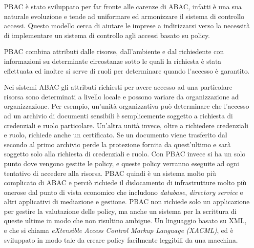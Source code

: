 PBAC è stato sviluppato per far fronte alle carenze di ABAC, infatti è una sua naturale evoluzione e tende ad uniformare ed armonizzare il sistema di controllo accessi.
Questo modello cerca di aiutare le imprese a indirizzarsi verso la necessità di implementare un sistema di controllo agli accessi basato su policy.\\ \par
PBAC combina attributi dalle risorse, dall'ambiente e dal richiedente con informazioni su determinate circostanze sotto le quali la richiesta è stata effettuata ed inoltre si serve di 
ruoli per determinare quando l'accesso è garantito.\\ \par
Nei sistemi ABAC gli attributi richiesti per avere accesso ad una particolare risorsa sono determinati a livello locale e possono variare da organizzazione ad organizzazione.
Per esempio, un'unità organizzativa può determinare che l'accesso ad un archivio di documenti sensibili è semplicemente soggetto a richiesta di credenziali e ruolo particolare.
Un'altra unità invece, oltre a richiedere credenziali e ruolo, richiede anche un certificato. Se un documento viene trasferito dal secondo al primo archivio perde la protezione fornita da quest'ultimo e sarà soggetto solo alla richiesta di credenziali e ruolo.
Con PBAC invece si ha un solo punto dove vengono gestite le policy, e queste policy verranno eseguite ad ogni tentativo di accedere alla risorsa.
PBAC quindi è un sistema molto più complicato di ABAC e perciò richiede il dislocamento di infrastrutture molto più onerose dal punto di vista economico che includono \textit{database}, \textit{directory service} e altri applicativi di mediazione e gestione.
PBAC non richiede solo un applicazione per gestire la valutazione delle policy, ma
anche un sistema per la scrittura di queste ultime in modo che
non risultino ambigue.
Un linguaggio basato su XML, e che si chiama
 \textit{eXtensible Access Control Markup Language (XACML)}, ed è sviluppato in modo tale da creare policy facilmente leggibili da una macchina.\\ \par

